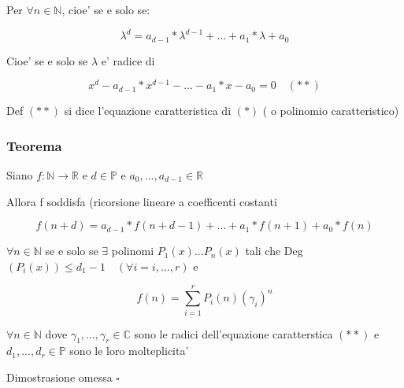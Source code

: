 \documentclass{article}
\begin{document}
        \begin{flushleft}
          Per $\forall n \in \mathbb{N}$, cioe' se e solo se:
        \end{flushleft}
        \begin{equation}
          \lambda^d=a_{d-1}*\lambda^{d-1}+...+a_1*\lambda+a_0
        \end{equation}
        \begin{flushleft}
          Cioe' se e solo se $\lambda$ e' radice di
        \end{flushleft}
        \begin{equation}
          x^d-a_{d-1}*x^{d-1}-...-a_1*x-a_0=0\quad (**)
        \end{equation}
        \begin{flushleft}
          Def $(**)$ si dice l'equazione caratteristica di $(*)$ ( o polinomio caratteristico)
        \end{flushleft}
        \subsubsection{Teorema}
        \begin{flushleft}
          Siano $f: \mathbb{N} \to \mathbb{R}$ e $d \in \mathbb{P}$ e $a_0,...,a_{d-1} \in \mathbb{R}$
        \end{flushleft}
        \begin{flushleft}
          Allora f soddisfa (ricorsione lineare a coefficenti costanti
        \end{flushleft}
        \begin{equation}
          f(n+d)=a_{d-1}*f(n+d-1)+...+a_1*f(n+1)+a_0*f(n)
        \end{equation}
        \begin{flushleft}
          $\forall n \in \mathbb{N}$ se e solo se $\exists$ polinomi $P_1(x)...P_n(x)$ tali che Deg$(P_i(x)) \leq d_1 -1 \quad (\forall i = i,...,r)$ e
        \end{flushleft}
        \begin{equation}
          f(n)= \sum^r_{i=1} P_i(n)(\gamma_i)^n
        \end{equation}
        \begin{flushleft}
          $\forall n \in \mathbb{N}$ dove $\gamma_1,...,\gamma_r \in \mathbb{C}$ sono le radici dell'equazione caratterstica $(**)$ e $d_1,...,d_r \in \mathbb{P}$
          sono le loro molteplicita'
        \end{flushleft}
        \begin{flushleft}
          Dimostrasione omessa $\square$
        \end{flushleft}
\end{document}
